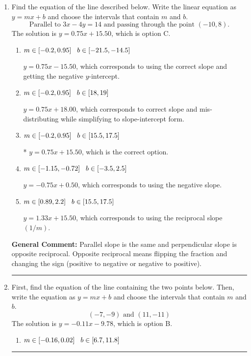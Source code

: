 \documentclass{extbook}[14pt]
\newcommand{\litem}[1]{\item #1

\rule{\textwidth}{0.4pt}}
\begin{document}
\begin{enumerate}\litem{
Find the equation of the line described below. Write the linear equation as $ y=mx+b $ and choose the intervals that contain $m$ and $b$.
\[ \text{Parallel to } 3 x - 4 y = 14 \text{ and passing through the point } (-10, 8). \]The solution is \( y = 0.75x + 15.50 \), which is option C.\begin{enumerate}[label=\Alph*.]
\item \( m \in [-0.2, 0.95] \hspace*{3mm} b \in [-21.5, -14.5] \)

 $y = 0.75x - 15.50$, which corresponds to using the correct slope and getting the negative $y$-intercept.
\item \( m \in [-0.2, 0.95] \hspace*{3mm} b \in [18, 19] \)

 $y = 0.75x + 18.00$, which corresponds to correct slope and mis-distributing while simplifying to slope-intercept form.
\item \( m \in [-0.2, 0.95] \hspace*{3mm} b \in [15.5, 17.5] \)

* $y = 0.75x + 15.50$, which is the correct option.
\item \( m \in [-1.15, -0.72] \hspace*{3mm} b \in [-3.5, 2.5] \)

 $y = -0.75x + 0.50$, which corresponds to using the negative slope.
\item \( m \in [0.89, 2.2] \hspace*{3mm} b \in [15.5, 17.5] \)

 $y = 1.33x + 15.50$, which corresponds to using the reciprocal slope $(1/m)$.
\end{enumerate}

\textbf{General Comment:} Parallel slope is the same and perpendicular slope is opposite reciprocal. Opposite reciprocal means flipping the fraction and changing the sign (positive to negative or negative to positive).
}
\litem{
First, find the equation of the line containing the two points below. Then, write the equation as $ y=mx+b $ and choose the intervals that contain $m$ and $b$.
\[ (-7, -9) \text{ and } (11, -11) \]The solution is \( y = -0.11x -9.78 \), which is option B.\begin{enumerate}[label=\Alph*.]
\item \( m \in [-0.16, 0.02] \hspace*{3mm} b \in [6.7, 11.8] \)


\end{enumerate}}
\end{enumerate}
\end{document}
